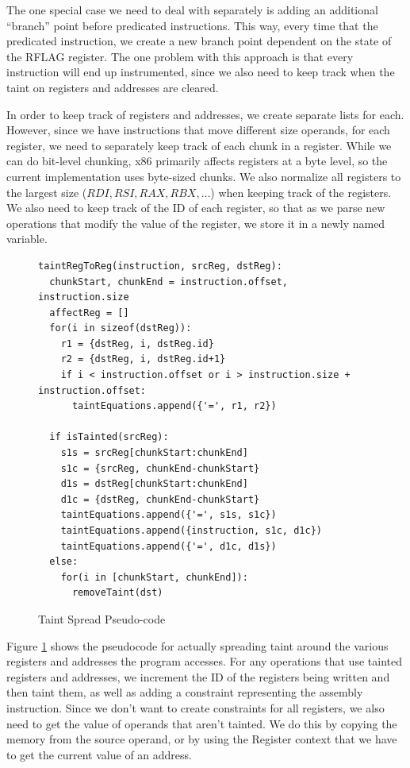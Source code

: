 The one special case we need to deal with separately is adding an additional
``branch'' point before predicated instructions. This way, every time that the
predicated instruction, we create a new branch point dependent on the state of
the RFLAG register. The one problem with this approach is that every instruction
will end up instrumented, since we also need to keep track when the taint on
registers and addresses are cleared.

In order to keep track of registers and addresses, we create separate lists for
each. However, since we have instructions that move different size operands, for
each register, we need to separately keep track of each chunk in a
register. While we can do bit-level chunking, x86 primarily affects registers at
a byte level, so the current implementation uses byte-sized chunks. We also
normalize all registers to the largest size ($RDI, RSI, RAX, RBX, \ldots$) when
keeping track of the registers. We also need to keep track of the ID of each
register, so that as we parse new operations that modify the value of the
register, we store it in a newly named variable.

\begin{figure}[ht]
 \centering
\begin{verbatim}
taintRegToReg(instruction, srcReg, dstReg):
  chunkStart, chunkEnd = instruction.offset, instruction.size
  affectReg = []
  for(i in sizeof(dstReg)):
    r1 = {dstReg, i, dstReg.id}
    r2 = {dstReg, i, dstReg.id+1}
    if i < instruction.offset or i > instruction.size + instruction.offset:
      taintEquations.append({'=', r1, r2})

  if isTainted(srcReg):
    s1s = srcReg[chunkStart:chunkEnd]
    s1c = {srcReg, chunkEnd-chunkStart}
    d1s = dstReg[chunkStart:chunkEnd]
    d1c = {dstReg, chunkEnd-chunkStart}
    taintEquations.append({'=', s1s, s1c})
    taintEquations.append({instruction, s1c, d1c})
    taintEquations.append({'=', d1c, d1s})
  else:
    for(i in [chunkStart, chunkEnd]):
      removeTaint(dst)
\end{verbatim}
 \caption{Taint Spread Pseudo-code}
 \label{figure:taintcode}
\end{figure}


Figure \ref{figure:taintcode} shows the pseudocode for actually spreading taint
around the various registers and addresses the program accesses. For any
operations that use tainted registers and addresses, we increment the ID of the
registers being written and then taint them, as well as adding a constraint
representing the assembly instruction. Since we don't want to create constraints
for all registers, we also need to get the value of operands that aren't
tainted. We do this by copying the memory from the source operand, or by using
the Register context that we have to get the current value of an address.

